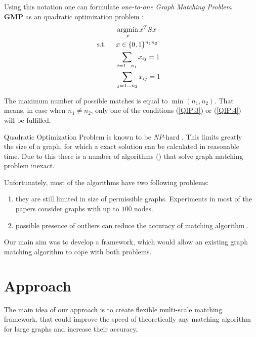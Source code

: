 \documentclass[
	fontsize=12pt,
	paper=a4,
	twoside=false,
	numbers=noenddot,
	plainheadsepline,
	toc=listof,
	toc=bibliography
]{scrartcl}
\def\argmax{\mathop{\rm argmax}}						%
\def\argmax{\mathop{\rm argmin}}						%
\begin{document}
Using this notation one can formulate \emph{one-to-one Graph Matching Problem} \textbf{GMP} as an quadratic optimization problem \cite{Cho2014_Haystack, Cho2010_RRWM, Cho2012_ProgressiveGM, Conte2004}: 
\begin{alignat}{2}
    &     && \argmax_x{x^TSx}                           \notag\\
    & \text{s.t. } &&  x\in \{0,1\}^{n_1n_2}            \label{QIP:2}\\
    &             &&  \sum_{i=1\dots n_1} x_{ij} = 1    \label{QIP:3}\\
    &             &&  \sum_{j=1\dots n_2} x_{ij} = 1    \label{QIP:4}
 \end{alignat}
 
The maximum number of possible matches is equal to $\min(n_1, n_2)$. That means, in case when $n_1\not = n_2$, only one of the conditions (\ref{QIP:3}) or (\ref{QIP:4}) will be fulfilled.

Quadratic Optimization Problem is known to be \emph{NP}-hard \cite{Sahni1974}. This limits greatly the size of a graph, for which a exact solution can be calculated in reasonable time. Due to this there is a number of algorithms () that solve graph matching problem inexact.

Unfortunately, most of the algorithms have two following problems:
\begin{enumerate}
\item they are still limited in size of permissible graphs. Experiments in most of the papers consider graphs with up to $100$ nodes.
\item possible presence of outliers can reduce the accuracy of matching algorithm \cite{Suh_CVPR2015}.
\end{enumerate}  

Our main aim was to develop a framework, which would allow an existing graph matching algorithm to cope with both problems.


\section{Approach}

The main idea of our approach is to create flexible multi-scale matching framework, that could improve the speed of
theoretically any matching algorithm for large graphs and increase their accuracy. 
\end{document}
